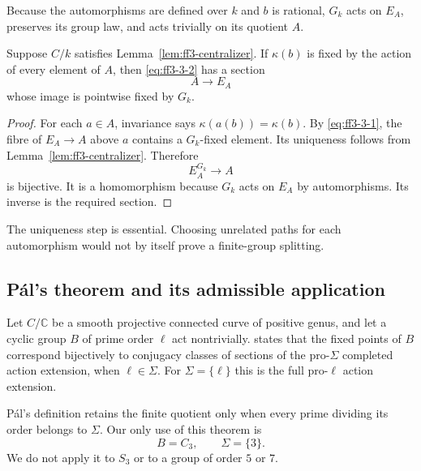 Because the automorphisms are defined over \(k\) and \(b\) is rational, \(G_k\) acts on \(E_A\), preserves its group law, and acts trivially on its quotient \(A\).

\begin{lemma}
\label{lem:ff3-invariant-action}

Suppose \(C/k\) satisfies Lemma~\ref{lem:ff3-centralizer}. If \(\kappa(b)\) is fixed by the action of every element of \(A\), then \eqref{eq:ff3-3-2} has a section \[
 A\longrightarrow E_A
\] whose image is pointwise fixed by \(G_k\).

\end{lemma}
\begin{proof}

For each \(a\in A\), invariance says \(\kappa(a(b))=\kappa(b)\). By \eqref{eq:ff3-3-1}, the fibre of \(E_A\to A\) above \(a\) contains a \(G_k\)-fixed element. Its uniqueness follows from Lemma~\ref{lem:ff3-centralizer}. Therefore \[
 E_A^{G_k}\longrightarrow A
\] is bijective. It is a homomorphism because \(G_k\) acts on \(E_A\) by automorphisms. Its inverse is the required section.

\end{proof}

The uniqueness step is essential. Choosing unrelated paths for each automorphism would not by itself prove a finite-group splitting.

\subsection{Pál’s theorem and its admissible application}
\label{subsec:ff3-pal}

Let \(C/\mathbb C\) be a smooth projective connected curve of positive genus, and let a cyclic group \(B\) of prime order \(\ell\) act nontrivially. \citet[Theorem~5.2, author pp.~12--13]{FCPal2014} states that the fixed points of \(B\) correspond bijectively to conjugacy classes of sections of the pro-\(\Sigma\) completed action extension, when \(\ell\in\Sigma\). For \(\Sigma=\{\ell\}\) this is the full pro-\(\ell\) action extension.

Pál's definition retains the finite quotient only when every prime dividing its order belongs to \(\Sigma\). Our only use of this theorem is \begin{equation}
B=C_3,\qquad \Sigma=\{3\}.
\label{eq:ff3-4-1}
\end{equation} We do not apply it to \(S_3\) or to a group of order \(5\) or \(7\).

